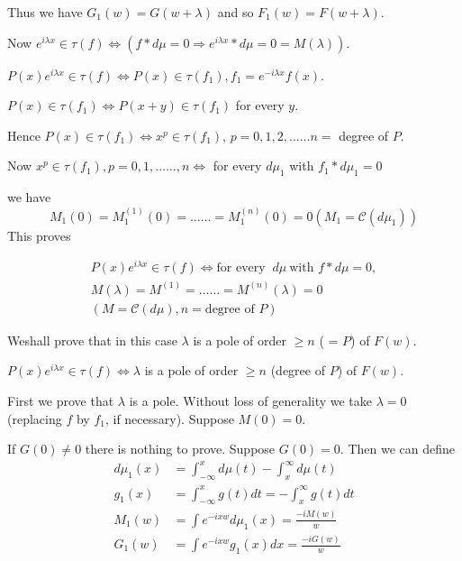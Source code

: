 Thus we have $G_1 (w) = G(w + \lambda )$ and so $F_1 (w) = F(w + \lambda )$.

Now $e^{i \lambda x} \in \tau (f) \Leftrightarrow (f * d \mu = 0
\Rightarrow e^{i \lambda x} * d \mu = 0 = M (\lambda ))$. 

$P(x) e^{i \lambda x} \in \tau (f) \Leftrightarrow P(x) \in \tau
(f_1), f_1 = e^{-i \lambda x} f(x)$. 

$P(x) \in \tau (f_1) \Leftrightarrow P(x + y) \in \tau (f_1)$ for every $y$.

Hence $P(x) \in \tau (f_1) \Leftrightarrow x^p \in \tau (f_1)$, $p =
0, 1, 2, \ldots \ldots n = $ degree of $P$. 

Now $x^p \in \tau (f_1), p = 0, 1, \ldots \ldots, n \Leftrightarrow$
for every $d \mu_1$ with $f_1 * d\mu_1 = 0$ 

we have
$$
M_1 (0) = M_1^{(1)} (0) = \ldots \ldots = M_1^{(n)} (0) = 0 (M_1 =
\mathscr{C} (d \mu_1)) 
$$
This proves
\begin{lemma*}%
 \begin{gather*}
   P(x) e^{i \lambda x} \in \tau (f) \Leftrightarrow \text{for
     every } ~d \mu ~\text{with } f * d \mu = 0, \\
   M(\lambda ) = M^{(1)} = \ldots \ldots = M^{(n)} (\lambda ) = 0\\
   (M = \mathscr{C}(d \mu), n = \text{degree of } P)
 \end{gather*}
\end{lemma*}

We\pageoriginale shall prove that in this case $\lambda$ is a pole of order $\geq n$
( =  $P$) of $F(w)$. 

\begin{theorem*}
  $P(x) e^{i \lambda x} \in \tau (f) \Leftrightarrow \lambda$ is a
  pole of order $\geq n$ (degree of $P$) of $F(w)$. 
\end{theorem*}

First we prove that $\lambda$ is a pole. Without loss of generality we
take $\lambda = 0$ (replacing $f$ by $f_1$, if necessary). Suppose
$M(0) = 0$. 

If $G(0) \neq 0$ there is nothing to prove. Suppose $G(0) = 0$. Then we can define
\begin{align*}
  d \mu_1 (x) &= \int_{-\infty}^x d \mu (t) -
  \int_x^\infty d \mu (t) \\ 
  g_1 (x) &= \int_{-\infty}^x g(t) dt = - \int_x^{\infty} g(t) dt\\ 
  M_1 (w) &= \int e^{-i x w} d\mu_1 (x) = \frac{-iM (w)}{w}\\
  G_1(w) &= \int e^{-i x w} g_1 (x) dx = \frac{-iG (w)}{w}
\end{align*}

